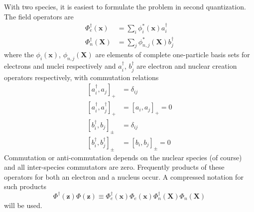 \documentclass[aps,preprint]{revtex4}%
\begin{document}
With two species, it is easiest to formulate the problem in second
quantization. The field operators are
\begin{align}
\Phi^{\dagger}_{e}(\mathbf{x})  &  = \sum_{i} \phi^{*}_{i}(\mathbf{x}%
)a_{i}^{\dagger}\nonumber\\
\Phi^{\dagger}_{n}(\mathbf{X})  &  = \sum_{j} \phi_{n,j}^{*}(\mathbf{X}%
)b_{j}^{\dagger} \label{fieldop}%
\end{align}
where the $\phi_{i}(\mathbf{x})$, $\phi_{n,j}(\mathbf{X})$ are elements of
complete one-particle basis sets for electrons and nuclei respectively and
$a_{i}^{\dagger}$, $b_{j}^{\dagger}$ are electron and nuclear creation
operators respectively, with commutation relations
\begin{align}
\left[  a_{i}^{\dagger}, a_{j} \right]  _{+}  &  = \delta_{ij}\nonumber\\
\left[  a_{i}^{\dagger}, a^{\dagger}_{j} \right]  _{+}  &  = \left[  a_{i},
a_{j} \right]  _{+} = 0\nonumber\\
\left[  b_{i}^{\dagger}, b_{j} \right]  _{\pm}  &  = \delta_{ij}\nonumber\\
\left[  b_{i}^{\dagger}, b^{\dagger}_{j} \right]  _{\pm}  &  = \left[
b_{i},b_{j} \right]  _{\pm} = 0
\end{align}
Commutation or anti-commutation depends on the nuclear species (of course) and
all inter-species commutators are zero. Frequently products of these operators
for both an electron and a nucleus occur. A compressed notation for such
products
\begin{equation}
\Phi^{\dagger}(\mathbf{z})\Phi(\mathbf{z}) \equiv\Phi^{\dagger}_{e}%
(\mathbf{x}) \Phi_{e}(\mathbf{x})\Phi^{\dagger}_{n}(\mathbf{X}) \Phi
_{n}(\mathbf{X}) \label{fieldopprod}%
\end{equation}
will be used.
\end{document}
